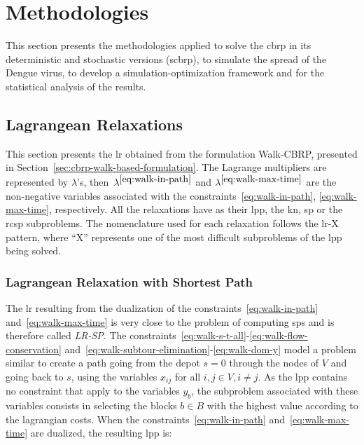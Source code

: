 \chapter{Methodologies}\label{chap:methodologies}

This section presents the methodologies applied to solve the \gls{cbrp} in its deterministic
and stochastic versions (\gls{scbrp}),
to simulate the spread of the Dengue virus, to develop a simulation-optimization framework
and for the statistical analysis of the results.

\section{Lagrangean Relaxations}\label{sec:lagrangean-relaxations}

\newcommand{\mult}[2]{\ensuremath{\lambda^{#1}_{#2}}}
\newcommand{\lrsp}{\textit{LR-SP}}
\newcommand{\lrkn}{\textit{LR-KN}}
\newcommand{\lrcsp}{\textit{LR-RCSP}}
\newcommand{\lrcspkn}{\textit{LR-RCSP-KN}}

This section presents the \gls{lr} obtained from the formulation Walk-CBRP, presented in
Section~\ref{sec:cbrp-walk-based-formulation}.
The Lagrange multipliers are represented by $\lambda$'s,
then~\mult{\ref{eq:walk-in-path}}{} and
\mult{\ref{eq:walk-max-time}}{} are
the non-negative variables  associated with the constraints~\eqref{eq:walk-in-path},
\eqref{eq:walk-max-time}, respectively. All  the relaxations have as their
\gls{lpp}, the \gls{kn}, \gls{sp} or the \gls{rcsp} subproblems.
The nomenclature used for each relaxation  follows the \gls{lr}-X pattern, where ``X''
represents one of the most difficult subproblems of the \gls{lpp} being solved.

\subsection{Lagrangean Relaxation with Shortest Path}\label{sec:lr-sp}

The \gls{lr} resulting from the dualization of the constraints~\eqref{eq:walk-in-path}
and~\eqref{eq:walk-max-time}
is very close to the problem of computing \gls{sp}s and is therefore called {\lrsp}.
The constraints~\eqref{eq:walk-s-t-all}-\eqref{eq:walk-flow-conservation}
and~\eqref{eq:walk-subtour-elimination}-\eqref{eq:walk-dom-y} model a problem similar
to create a path going from the depot $s = 0$ through the nodes of $V$ and going back to $s$,
using the variables $x_{ij}$ for all $i, j \in V, i \neq j$. As the \gls{lpp} contains no
constraint that apply to the variables $y_{b}$, the subproblem associated with these variables
consists in selecting the blocks $b \in B$ with the highest value  according to the lagrangian costs.
When the constraints~\eqref{eq:walk-in-path} and~\eqref{eq:walk-max-time}
are dualized, the resulting \gls{lpp} is:

